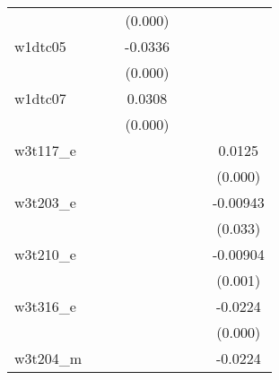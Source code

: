 {\begin{tabular}{l*{6}{c}}
            &                     &                     &     (0.000)         &                     &                     &                     \\
[1em]
w1dtc05     &                     &                     &     -0.0336\sym{***}&                     &                     &                     \\
            &                     &                     &     (0.000)         &                     &                     &                     \\
[1em]
w1dtc07     &                     &                     &      0.0308\sym{***}&                     &                     &                     \\
            &                     &                     &     (0.000)         &                     &                     &                     \\
[1em]
w3t117\_e    &                     &                     &                     &                     &                     &      0.0125\sym{***}\\
            &                     &                     &                     &                     &                     &     (0.000)         \\
[1em]
w3t203\_e    &                     &                     &                     &                     &                     &    -0.00943\sym{**} \\
            &                     &                     &                     &                     &                     &     (0.033)         \\
[1em]
w3t210\_e    &                     &                     &                     &                     &                     &    -0.00904\sym{***}\\
            &                     &                     &                     &                     &                     &     (0.001)         \\
[1em]
w3t316\_e    &                     &                     &                     &                     &                     &     -0.0224\sym{***}\\
            &                     &                     &                     &                     &                     &     (0.000)         \\
[1em]
w3t204\_m    &                     &                     &                     &                     &                     &     -0.0224\sym{***}\\

\end{tabular}}
